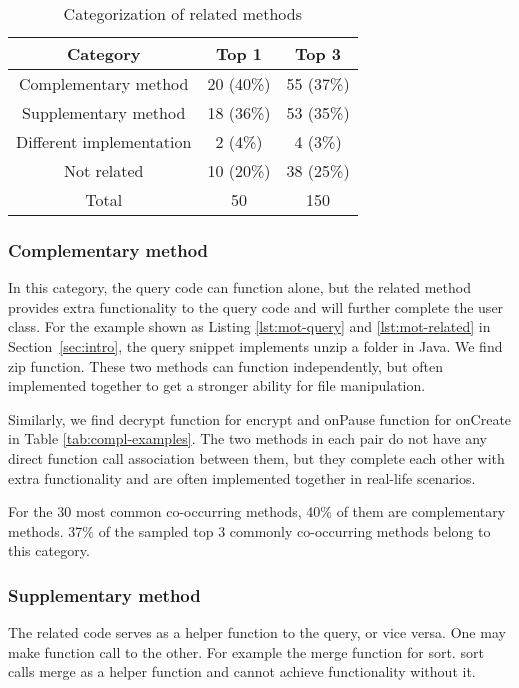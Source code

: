 \begin{table}[h]
	\caption{Categorization of related methods}
	\label{tab:categorization}
	\begin{center}
		\begin{tabular}{ c|c|c } 
			\hline
			Category & Top 1 & Top 3 \\\hline
			Complementary method &  20 (40\%) & 55 (37\%)\\\hline 
			Supplementary method &  18 (36\%) & 53 (35\%) \\ \hline
			Different implementation &  2 (4\%) & 4 (3\%)\\ \hline
			Not related & 10 (20\%) & 38 (25\%)\\\hline
			Total & 50 & 150 \\\hline
		\end{tabular}		
	\end{center}

\end{table}
		

\subsubsection{Complementary method} In this category, the query code can function alone, but the related method provides extra functionality to the query code and will further complete the user class. For the example shown as Listing \ref{lst:mot-query} and \ref{lst:mot-related} in Section~\ref{sec:intro}, the query snippet implements unzip a folder in Java.  We find {\ttt zip} function. These two methods can function independently, but often implemented together to get a stronger ability for file manipulation. 

Similarly, we find {\ttt decrypt} function for {\ttt encrypt} and {\ttt onPause} function for {\ttt onCreate} in Table \ref{tab:compl-examples}. The two methods in each pair do not have any direct function call association between them, but they complete each other with extra functionality and are often implemented together in real-life scenarios. 

For the 30 most common co-occurring methods, 40\% of them are complementary methods. 37\% of the sampled top 3 commonly co-occurring methods belong to this category.

\subsubsection{Supplementary method} The related code serves as a helper function to the query, or vice versa. One may make function call to the other. For example the {\ttt merge} function for {\ttt sort}. {\ttt sort} calls {\ttt merge} as a helper function and cannot achieve functionality without it. 

